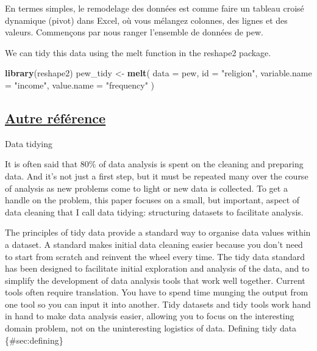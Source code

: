 \documentclass[]{article}
\newenvironment{Shaded}{\begin{snugshade}}{\end{snugshade}}
\newcommand{\KeywordTok}[1]{\textcolor[rgb]{0.13,0.29,0.53}{\textbf{{#1}}}}
\newcommand{\DataTypeTok}[1]{\textcolor[rgb]{0.13,0.29,0.53}{{#1}}}
\newcommand{\StringTok}[1]{\textcolor[rgb]{0.31,0.60,0.02}{{#1}}}
\newcommand{\NormalTok}[1]{{#1}}
\begin{document}
En termes simples, le remodelage des données est comme faire un tableau
croisé dynamique (pivot) dans Excel, où vous mélangez colonnes, des
lignes et des valeurs. Commençons par nous ranger l'ensemble de données
de pew.

We can tidy this data using the melt function in the reshape2 package.

\begin{Shaded}
\begin{Highlighting}[]
\KeywordTok{library}\NormalTok{(reshape2)}
\NormalTok{pew_tidy <-}\StringTok{ }\KeywordTok{melt}\NormalTok{(}
  \DataTypeTok{data =} \NormalTok{pew,}
  \DataTypeTok{id =} \StringTok{"religion"}\NormalTok{,}
  \DataTypeTok{variable.name =} \StringTok{"income"}\NormalTok{,}
  \DataTypeTok{value.name =} \StringTok{"frequency"}
\NormalTok{)}
\end{Highlighting}
\end{Shaded}

\subsection{\href{http://cran.r-project.org/web/packages/tidyr/vignettes/tidy-data.html}{Autre
référence}}\label{autre-reference}

Data tidying

It is often said that 80\% of data analysis is spent on the cleaning and
preparing data. And it's not just a first step, but it must be repeated
many over the course of analysis as new problems come to light or new
data is collected. To get a handle on the problem, this paper focuses on
a small, but important, aspect of data cleaning that I call data
tidying: structuring datasets to facilitate analysis.

The principles of tidy data provide a standard way to organise data
values within a dataset. A standard makes initial data cleaning easier
because you don't need to start from scratch and reinvent the wheel
every time. The tidy data standard has been designed to facilitate
initial exploration and analysis of the data, and to simplify the
development of data analysis tools that work well together. Current
tools often require translation. You have to spend time munging the
output from one tool so you can input it into another. Tidy datasets and
tidy tools work hand in hand to make data analysis easier, allowing you
to focus on the interesting domain problem, not on the uninteresting
logistics of data. Defining tidy data \{\#sec:defining\}
\end{document}
